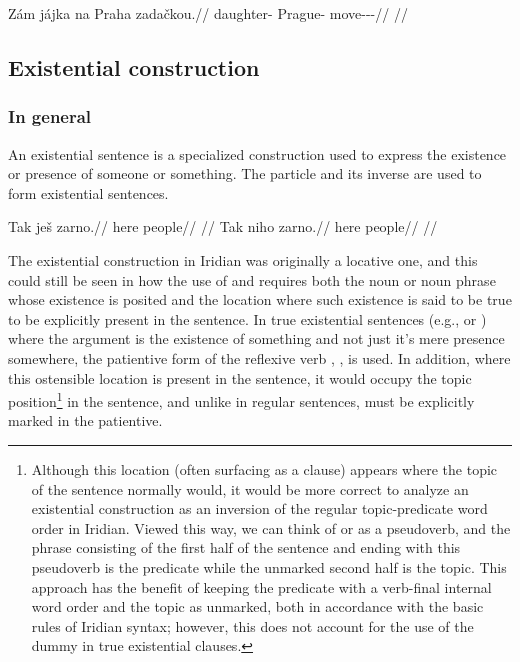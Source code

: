 \pex
\begingl
    \gla Zám jájka na Praha zadačkou.//
    \glb \Neg{} daughter-\Dim{} \Loc{} Prague-\Acc{} move-\Av{}-\Pf{}-\Nz{}//
    \glft {}//
\endgl
\xe




\subsection{Existential construction}
\label{sec:exst}

\subsubsection{In general}
An existential sentence is a specialized construction used to express the
existence or presence of someone or something. The particle  and its
inverse  are used to form existential sentences. 
\begin{multicols}{2}
\pex
\a\begingl
\gla Tak ješ zarno.//
\glb here \Exst{} people//
\glft {}//
\endgl
\a\begingl
\gla Tak niho zarno.//
\glb here \N{}\Exst{} people//
\glft {}//
\endgl
\xe
\end{multicols}

The existential construction in Iridian was originally a
locative one, and this could still be seen in how the use of
 and  requires both the noun or noun phrase whose existence
is posited and the location where such existence is said to be true to be
explicitly present in the sentence. In true existential sentences (e.g.,
 or ) where the argument is the
existence of something and not just it's mere presence somewhere, the patientive
form of the reflexive verb , , is used. In addition, where this
ostensible location is present in the sentence, it would occupy the
topic position\footnote{Although this location (often surfacing as
a  clause) appears where the topic of the sentence normally would, it
would be more correct to analyze an existential construction as an inversion of
the regular topic-predicate word order in Iridian. Viewed this way, we can think
of  or  as a pseudoverb, and the phrase consisting of the
first half of the sentence and ending with this pseudoverb is the predicate
while the unmarked second half is the topic. This approach has the benefit of
keeping the predicate with a verb-final internal word order and the topic as
unmarked, both in accordance with the basic rules of Iridian syntax; however,
this does not account for the use of the dummy  in true existential
clauses.} in the sentence, and unlike in regular sentences, must be explicitly
marked in the patientive.


